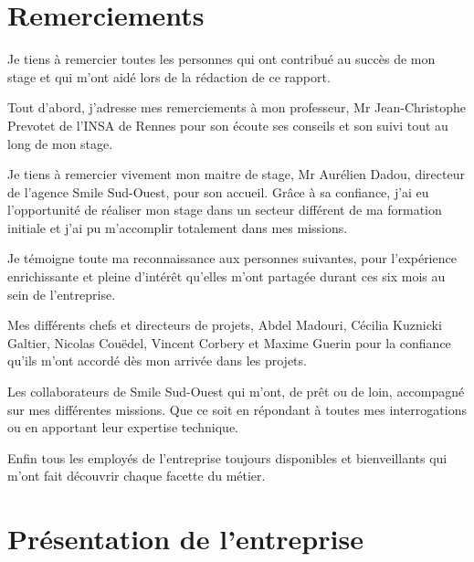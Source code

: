\documentclass[a4paper,11pt,twoside]{report}
\begin{document}
\chapter*{Remerciements}
\thispagestyle{\chead{ }}
Je tiens à remercier toutes les personnes qui ont contribué au succès de mon stage et qui m'ont aidé lors de la rédaction de ce rapport.

Tout d'abord, j'adresse mes remerciements à mon professeur, Mr Jean-Christophe Prevotet de l'INSA de Rennes pour son écoute ses conseils et son suivi tout au long de mon stage.

Je tiens à remercier vivement mon maitre de stage, Mr Aurélien Dadou, directeur de l'agence Smile Sud-Ouest, pour son accueil. Grâce à sa confiance, j'ai eu l'opportunité de réaliser mon stage dans un secteur différent de ma formation initiale et j'ai pu m'accomplir totalement dans mes missions. 
 
Je témoigne toute ma reconnaissance aux personnes suivantes, pour l’expérience enrichissante et pleine d’intérêt qu’elles m’ont partagée durant ces six mois au sein de l’entreprise. 

Mes différents chefs et directeurs de projets, Abdel Madouri, Cécilia Kuznicki Galtier, Nicolas Couëdel, Vincent Corbery et Maxime Guerin pour la confiance qu’ils m’ont accordé dès mon arrivée dans les projets.

Les collaborateurs de Smile Sud-Ouest qui m'ont, de prêt ou de loin, accompagné sur mes différentes missions. Que ce soit en répondant à toutes mes interrogations ou en apportant leur expertise technique.

Enfin tous les employés de l'entreprise toujours disponibles et bienveillants qui m'ont fait découvrir chaque facette du métier.

\tableofcontents
\thispagestyle{\chead{ }}

\chapter{Présentation de l'entreprise}
\end{document}
